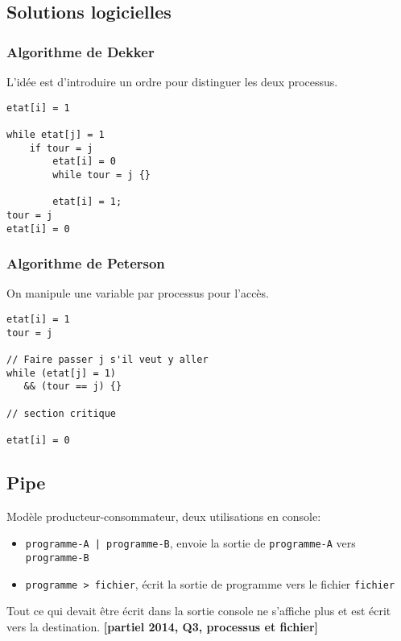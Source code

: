 \documentclass[a4paper]{article}
\begin{document}
\begin{multicols*}{2}
    \subsection{Solutions logicielles}

    \subsubsection{Algorithme de Dekker}

    L'idée est d'introduire un ordre pour distinguer les deux processus.
    \begin{lstlisting}[frame=shadowbox]
etat[i] = 1

while etat[j] = 1
    if tour = j
        etat[i] = 0
        while tour = j {}
        
        etat[i] = 1;
tour = j
etat[i] = 0
    \end{lstlisting}

    \subsubsection{Algorithme de Peterson}

    On manipule une variable par processus pour l'accès.
    \begin{lstlisting}[frame=shadowbox]
etat[i] = 1
tour = j

// Faire passer j s'il veut y aller
while (etat[j] = 1) 
   && (tour == j) {} 

// section critique

etat[i] = 0
    \end{lstlisting}

    \subsection{Pipe}

    Modèle producteur-consommateur, deux utilisations en console:
    \begin{itemize}
        \item \texttt{programme-A | programme-B}, envoie la sortie de \texttt{programme-A} vers \texttt{programme-B}
        \item \texttt{programme > fichier}, écrit la sortie de programme vers le fichier \texttt{fichier}
    \end{itemize}

    Tout ce qui devait être écrit dans la sortie console ne s'affiche plus et est écrit vers la destination. \textbf{[partiel 2014, Q3, processus et fichier]}


\end{multicols*}
\end{document}
